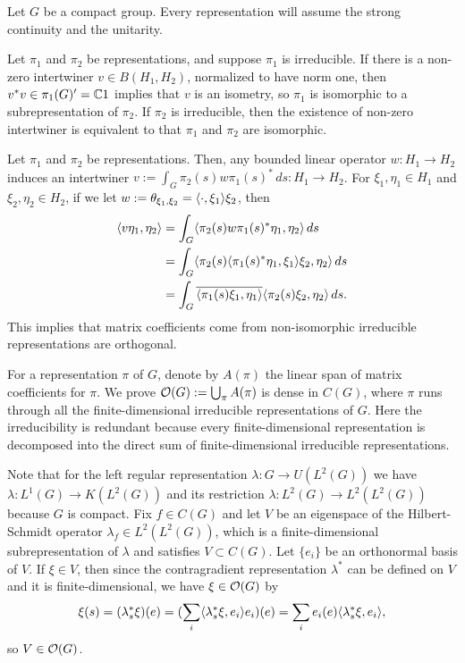 \documentclass{../../large}
\begin{document}
Let $G$ be a compact group.
Every representation will assume the strong continuity and the unitarity.

Let $\pi_1$ and $\pi_2$ be representations, and suppose $\pi_1$ is irreducible.
If there is a non-zero intertwiner $v\in B(H_1,H_2)$, normalized to have norm one, then $v^*v\in\pi_1(G)'=\mathbb{C}1$ implies that $v$ is an isometry, so $\pi_1$ is isomorphic to a subrepresentation of $\pi_2$.
If $\pi_2$ is irreducible, then the existence of non-zero intertwiner is equivalent to that $\pi_1$ and $\pi_2$ are isomorphic.

Let $\pi_1$ and $\pi_2$ be representations.
Then, any bounded linear operator $w:H_1\to H_2$ induces an intertwiner $v:=\int_G\pi_2(s)w\pi_1(s)^*\,ds:H_1\to H_2$.
For $\xi_1,\eta_1\in H_1$ and $\xi_2,\eta_2\in H_2$, if we let $w:=\theta_{\xi_1,\xi_2}=\langle\cdot,\xi_1\rangle\xi_2$, then
\begin{align*}
\langle v\eta_1,\eta_2\rangle
&=\int_G\langle\pi_2(s)w\pi_1(s)^*\eta_1,\eta_2\rangle\,ds\\
&=\int_G\langle\pi_2(s)\langle\pi_1(s)^*\eta_1,\xi_1\rangle\xi_2,\eta_2\rangle\,ds\\
&=\int_G\overline{\langle\pi_1(s)\xi_1,\eta_1\rangle}\langle\pi_2(s)\xi_2,\eta_2\rangle\,ds.
\end{align*}
This implies that matrix coefficients come from non-isomorphic irreducible representations are orthogonal.

For a representation $\pi$ of $G$, denote by $A(\pi)$ the linear span of matrix coefficients for $\pi$.
We prove $\mathcal{O}(G):=\bigcup_\pi A(\pi)$ is dense in $C(G)$, where $\pi$ runs through all the finite-dimensional irreducible representations of $G$.
Here the irreducibility is redundant because every finite-dimensional representation is decomposed into the direct sum of finite-dimensional irreducible representations.

Note that for the left regular representation $\lambda:G\to U(L^2(G))$ we have $\lambda:L^1(G)\to K(L^2(G))$ and its restriction $\lambda:L^2(G)\to L^2(L^2(G))$ because $G$ is compact.
Fix $f\in C(G)$ and let $V$ be an eigenspace of the Hilbert-Schmidt operator $\lambda_f\in L^2(L^2(G))$, which is a finite-dimensional subrepresentation of $\lambda$ and satisfies $V\subset C(G)$.
Let $\{e_i\}$ be an orthonormal basis of $V$.
If $\xi\in V$, then since the contragradient representation $\lambda^*$ can be defined on $V$ and it is finite-dimensional, we have $\xi\in\mathcal{O}(G)$ by
\[\xi(s)=(\lambda_s^*\xi)(e)=(\sum_i\langle\lambda_s^*\xi,e_i\rangle e_i)(e)=\sum_ie_i(e)\langle\lambda_s^*\xi,e_i\rangle,\]
so $V\in\mathcal{O}(G)$.
\end{document}
